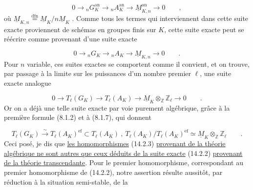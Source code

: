 \begin{equation*}
0 \longrightarrow {}_nG_K^{\mathrm{an}} \longrightarrow {}_nA_K^{\mathrm{an}} \longrightarrow \underline{M}_{K,n}^{\mathrm{an}} \longrightarrow 0 \qquad ,
\end{equation*}
où $\underline{M}_{K,n} \overset{\mathrm{dfn}}{=} \underline{M}_K/n\underline{M}_K$ . Comme tous les termes qui interviennent dans cette suite exacte proviennent de schémas en groupes finis sur $K$, cette suite exacte peut se réécrire comme provenant d'une suite exacte

\begin{equation}\tag{14.2.1}
0 \longrightarrow {}_nG_K \longrightarrow {}_nA_K \longrightarrow \underline{M}_{K,n} \longrightarrow 0 \qquad .
\end{equation}
Pour $n$ variable, ces suites exactes se comportent comme il convient, et on trouve, par passage à la limite sur les puissances d'un nombre premier $\ell$, une suite exacte analogue

\begin{equation}\tag{14.2.2}
0 \longrightarrow T_\ell(G_K) \longrightarrow T_\ell(A_K) \longrightarrow \underline{M}_K \otimes_{\mathbb{Z}} \mathbb{Z}_\ell \longrightarrow 0 \qquad .
\end{equation}
Or on a déjà une telle suite exacte par voie purement algébrique, grâce à la première formule (8.1.2) et à (8.1.7), qui donnent

\begin{equation}\tag{14.2.3}
T_\ell(G_K) \overset{\sim}{\longrightarrow} T_\ell(A_K)^{\mathrm{ef}} \subset T_\ell(A_K) \ , \ T_\ell(A_K)/T_\ell(A_K)^{\mathrm{ef}} \simeq \underline{M}_K \otimes_{\mathbb{Z}} \mathbb{Z}_\ell \qquad .
\end{equation}
Ceci posé, je dis que \underline{les homomorphismes} (14.2.3) \underline{provenant de la théorie algébrique ne sont autres que ceux déduits de la suite exacte} (14.2.2) \underline{provenant de la théorie transcendante}. Pour le premier homomorphisme, correspondant au premier homomorphisme de (14.2.2), notre assertion résulte aussitôt, par réduction à la situation semi-stable, de la



